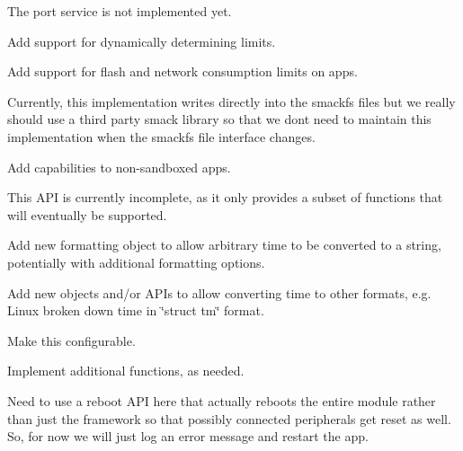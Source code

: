 \begin{DoxyRefList}
The port service is not implemented yet. 
\item[\label{todo__todo000059}%
\hypertarget{todo__todo000059}{}%
File \hyperlink{sbtrace_8c}{sbtrace.c} ]Add support for dynamically determining limits. 
\item[\label{todo__todo000017}%
\hypertarget{todo__todo000017}{}%
Page \hyperlink{conceptsSecurity}{Security} ]Add support for flash and network consumption limits on apps. 
\item[\label{todo__todo000053}%
\hypertarget{todo__todo000053}{}%
File \hyperlink{smack_8c}{smack.c} ]Currently, this implementation writes directly into the smackfs files but we really should use a third party smack library so that we don\textquotesingle{}t need to maintain this implementation when the smackfs file interface changes. 
\item[\label{todo__todo000013}%
\hypertarget{todo__todo000013}{}%
File \hyperlink{supervisor_8c}{supervisor.c} ]Add capabilities to non-\/sandboxed apps. 
\item[\label{todo__todo000020}%
\hypertarget{todo__todo000020}{}%
Page \hyperlink{c_clock}{System Clock A\+PI} ]This A\+PI is currently incomplete, as it only provides a subset of functions that will eventually be supported.


\begin{DoxyItemize}
\item Add new formatting object to allow arbitrary time to be converted to a string, potentially with additional formatting options.
\item Add new objects and/or A\+P\+Is to allow converting time to other formats, e.\+g. Linux broken down time in \char`\"{}struct tm\char`\"{} format. 
\end{DoxyItemize}
\item[\label{todo__todo000054}%
\hypertarget{todo__todo000054}{}%
Global \hyperlink{thread_8c_a4fc325e70c9ce60d7cb7dda3b7ecc3d8}{T\+H\+R\+E\+A\+D\+\_\+\+P\+O\+O\+L\+\_\+\+S\+I\+ZE} ]Make this configurable.  
\item[\label{todo__todo000055}%
\hypertarget{todo__todo000055}{}%
Page \hyperlink{c_unixSockets}{Unix Domain Sockets A\+PI} ]Implement additional functions, as needed. 
\item[\label{todo__todo000011}%
\hypertarget{todo__todo000011}{}%
Global \hyperlink{apps_8c_a096ab66a5a6b91dd895b73b135ca47e3}{wdog\+\_\+\+Watchdog\+Timed\+Out} (wdog\+\_\+\+Server\+Cmd\+Ref\+\_\+t cmd\+Ref, uint32\+\_\+t proc\+Id)]Need to use a reboot A\+PI here that actually reboots the entire module rather than just the framework so that possibly connected peripherals get reset as well. So, for now we will just log an error message and restart the app. 
\end{DoxyRefList}